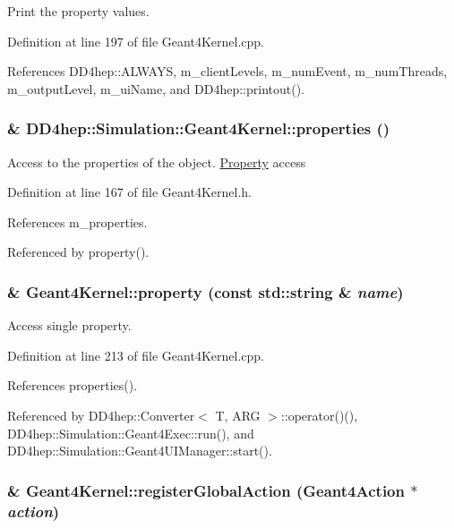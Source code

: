 Print the property values. 

Definition at line 197 of file Geant4Kernel.cpp.

References DD4hep::ALWAYS, m\_\-clientLevels, m\_\-numEvent, m\_\-numThreads, m\_\-outputLevel, m\_\-uiName, and DD4hep::printout().\hypertarget{class_d_d4hep_1_1_simulation_1_1_geant4_kernel_a39d0b3dcebed9c0ec950410df346710b}{
\subsubsection[{properties}]{\& DD4hep::Simulation::Geant4Kernel::properties ()}}
\label{class_d_d4hep_1_1_simulation_1_1_geant4_kernel_a39d0b3dcebed9c0ec950410df346710b}


Access to the properties of the object. \hyperlink{class_d_d4hep_1_1_property}{Property} access 

Definition at line 167 of file Geant4Kernel.h.

References m\_\-properties.

Referenced by property().\hypertarget{class_d_d4hep_1_1_simulation_1_1_geant4_kernel_a51c2d757b81b0c8ee31be77515d4d622}{
\subsubsection[{property}]{ \& Geant4Kernel::property (const std::string \& {\em name})}}
\label{class_d_d4hep_1_1_simulation_1_1_geant4_kernel_a51c2d757b81b0c8ee31be77515d4d622}


Access single property. 

Definition at line 213 of file Geant4Kernel.cpp.

References properties().

Referenced by DD4hep::Converter$<$ T, ARG $>$::operator()(), DD4hep::Simulation::Geant4Exec::run(), and DD4hep::Simulation::Geant4UIManager::start().\hypertarget{class_d_d4hep_1_1_simulation_1_1_geant4_kernel_a8792d3d0db403a52fe6495456b45c97a}{
\subsubsection[{registerGlobalAction}]{ \& Geant4Kernel::registerGlobalAction ({\bf Geant4Action} $\ast$ {\em action})}}
\label{class_d_d4hep_1_1_simulation_1_1_geant4_kernel_a8792d3d0db403a52fe6495456b45c97a}


